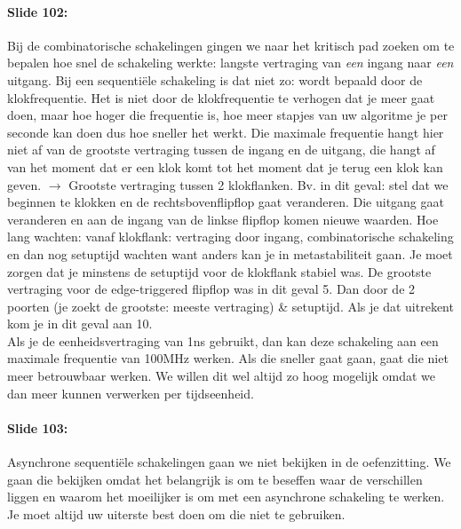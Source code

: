 \documentclass[10pt,a4paper]{book}
\begin{document}
\paragraph{Slide 102:} Bij de combinatorische schakelingen gingen we naar het kritisch pad zoeken om te bepalen hoe snel de schakeling werkte: langste vertraging van \emph{een} ingang naar \emph{een} uitgang. Bij een sequenti\"ele schakeling is dat niet zo: wordt bepaald door de klokfrequentie. Het is niet door de klokfrequentie te verhogen dat je meer gaat doen, maar hoe hoger die frequentie is, hoe meer stapjes van uw algoritme je per seconde kan doen dus hoe sneller het werkt. Die maximale frequentie hangt hier niet af van de grootste vertraging tussen de ingang en de uitgang, die hangt af van het moment dat er een klok komt tot het moment dat je terug een klok kan geven. $\rightarrow$ Grootste vertraging tussen 2 klokflanken.
Bv. in dit geval: stel dat we beginnen te klokken en de rechtsbovenflipflop gaat veranderen. Die uitgang gaat veranderen en aan de ingang van de linkse flipflop komen nieuwe waarden.
Hoe lang wachten: vanaf klokflank: vertraging door ingang, combinatorische schakeling en dan nog setuptijd wachten want anders kan je in metastabiliteit gaan. Je moet zorgen dat je minstens de setuptijd voor de klokflank stabiel was. De grootste vertraging voor de edge-triggered flipflop was in dit geval 5. Dan door de 2 poorten (je zoekt de grootste: meeste vertraging) \& setuptijd. Als je dat uitrekent kom je in dit geval aan 10.\\
Als je de eenheidsvertraging van 1ns gebruikt, dan kan deze schakeling aan een maximale frequentie van 100MHz werken. Als die sneller gaat gaan, gaat die niet meer betrouwbaar werken. We willen dit wel altijd zo hoog mogelijk omdat we dan meer kunnen verwerken per tijdseenheid.

\paragraph{Slide 103:} Asynchrone sequenti\"ele schakelingen gaan we niet bekijken in de oefenzitting. We gaan die bekijken omdat het belangrijk is om te beseffen waar de verschillen liggen en waarom het moeilijker is om met een asynchrone schakeling te werken. Je moet altijd uw uiterste best doen om die niet te gebruiken.
\end{document}
